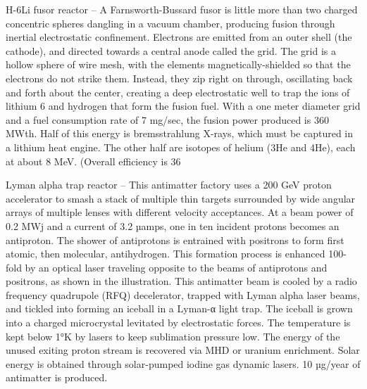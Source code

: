 \documentclass[a4paper]{book}
\begin{document}
H-6Li fusor reactor – A Farnsworth-Bussard fusor is little more than two charged concentric spheres dangling in a vacuum chamber, producing fusion through inertial electrostatic confinement. Electrons are emitted from an outer shell (the cathode), and directed towards a central anode called the grid.  The grid is a hollow sphere of wire mesh, with the elements magnetically-shielded so that the electrons do not strike them.  Instead, they zip right on through, oscillating back and forth about the center, creating a deep electrostatic well to trap the ions of lithium 6 and hydrogen that form the fusion fuel. With a one meter diameter grid and a fuel consumption rate of 7 mg/sec, the fusion power produced is 360 MWth.  Half of this energy is bremsstrahlung X-rays, which must be captured in a lithium heat engine. The other half are isotopes of helium (3He and 4He), each at about 8 MeV. (Overall efficiency is 36%
 
Lyman alpha trap reactor – This antimatter factory uses a 200 GeV proton accelerator to smash a stack of multiple thin targets surrounded by wide angular arrays of multiple lenses with different velocity acceptances.  At a beam power of 0.2 MWj and a current of 3.2 µamps, one in ten incident protons becomes an antiproton.  The shower of antiprotons is entrained with positrons to form first atomic, then molecular, antihydrogen. This formation process is enhanced 100-fold by an optical laser traveling opposite to the beams of antiprotons and positrons, as shown in the illustration. This antimatter beam is cooled by a radio frequency quadrupole (RFQ) decelerator, trapped with Lyman alpha laser beams, and tickled into forming an iceball in a Lyman-α light trap.  The iceball is grown into a charged microcrystal levitated by electrostatic forces.  The temperature is kept below 1°K by lasers to keep sublimation pressure low.  The energy of the unused exiting proton stream is recovered via MHD or uranium enrichment. Solar energy is obtained through solar-pumped iodine gas dynamic lasers. 10 µg/year of antimatter is produced.
\end{document}
